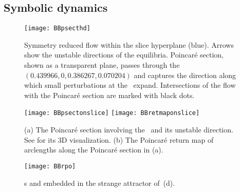 \documentclass[aip,cha,
reprint,
secnumarabic,
nofootinbib, tightenlines,
nobibnotes, showkeys, showpacs,
groupedaddress,
]{revtex4-1}
\begin{document}
\subsection{Symbolic dynamics}

\begin{figure}%
\centering
 \texttt{[image: BBpsecthd]}
\caption{
Symmetry reduced flow within the slice hyperplane (blue). Arrows
show the unstable directions of the equilibria. Poincar\'e section, shown as
a transparent plane, passes through the \reqv\ $(0.439966, 0, 0.386267, 0.070204)$
and captures the direction along which small perturbations at the \reqv\ expand.
Intersections of the flow with the Poincar\'e section are marked with black dots.
}
\label{fig:BBpsecthd}
\end{figure}

\begin{figure}
\centering
  \texttt{[image: BBpsectonslice]}
  \texttt{[image: BBretmaponslice]}
\caption{(a) The Poincar\'e section involving the \reqv\ and its unstable direction.
		  See  for its 3D visualization.
		  (b) The Poincar\'e return map of arclengths along the Poincar\'e section
		  in (a).}
\label{fig:psectandretmap}
\end{figure}



\begin{figure}%
  \begin{center}
  \texttt{[image: BBrpo]}
  \end{center}
  \caption{
	\Rpo s  and  embedded in the strange attractor
    of \,(d).
    }
  \label{fig:BBrpo1-01}
\end{figure}
\end{document}
